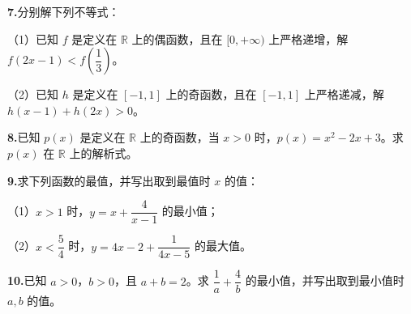 \documentclass[UTF8,zihao=-4]{ctexart}
\newcommand{\subq}[1]{\par\Needspace{2\baselineskip}（#1）}
\begin{document}
\clearpage
{}
\textbf{7.}\quad 分别解下列不等式：
\subq{1}已知 $f$ 是定义在 $\mathbb R$ 上的偶函数，且在 $[0,+\infty)$ 上严格递增，解 $f(2x-1)<f\!\left(\dfrac13\right)$。
\subq{2}已知 $h$ 是定义在 $[-1,1]$ 上的奇函数，且在 $[-1,1]$ 上严格递减，解 $h(x-1)+h(2x)>0$。
\par\vspace*{5.4cm}
\textbf{8.}\quad 已知 $p(x)$ 是定义在 $\mathbb R$ 上的奇函数，当 $x>0$ 时，$p(x)=x^2-2x+3$。求 $p(x)$ 在 $\mathbb R$ 上的解析式。
\par\vspace*{5.2cm}
\clearpage
{}
\textbf{9.}\quad 求下列函数的最值，并写出取到最值时 $x$ 的值：
\subq{1}$x>1$ 时，$y=x+\dfrac4{x-1}$ 的最小值；
\subq{2}$x<\dfrac54$ 时，$y=4x-2+\dfrac1{4x-5}$ 的最大值。
\par\vspace*{5.1cm}
\textbf{10.}\quad 已知 $a>0$，$b>0$，且 $a+b=2$。求 $\dfrac1a+\dfrac4b$ 的最小值，并写出取到最小值时 $a,b$ 的值。
\par\vspace*{5.9cm}
\end{document}
